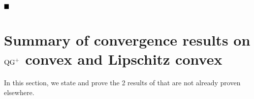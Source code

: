 $\hfill\blacksquare$


\section{\texorpdfstring{Summary of convergence results on $\QG^+$ convex and Lipschitz convex}{Summary of convergence results on QG+ convex and Lipschitz convex}}
\label{apx:tab}

In this section, we state and prove the 2 results of  that are not already proven elsewhere.

\addtocounter{table}{-1}

\begin{table}[h!]
{
\caption{
Optimality of the proposed methods over the set of $\QG^+$ convex functions and $M$-Lipschitz convex functions. ELS: Exact Line-Search. $\cmark$ indicates optimality among the class and $\xmark$ the contrary. All counter examples are given in App.~\ref{apx:tab}. $\ ^{\dagger}$:~constants resulting in optimal convergence rates depend on the class, thus for example heavy-ball with step-size $\frac{\text{constant}}{(t+2)}$ is not adaptive as it does not achieve the optimal rate for both classes with the same constant. $\ ^\ddagger$: up to a $\log$ factor.
} \vspace{-0.3cm}
\begin{center}
{\renewcommand{\arraystretch}{1.8}
}
\end{center}}
\end{table}
